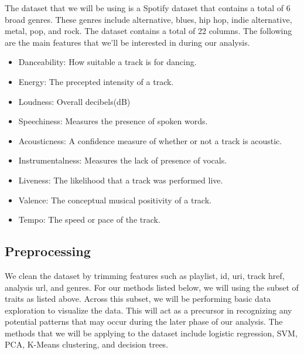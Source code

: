 \documentclass[11pt, a4paper, twocolumn]{article}
\begin{document}
The dataset that we will be using is a Spotify dataset that contains a total of 6 broad genres. These genres include alternative, blues, hip hop, indie alternative, metal, pop, and rock. The dataset contains a total of 22 columns. The following are the main features that we'll be interested in during our analysis. 
\begin{itemize}
\item Danceability: How suitable a track is for dancing. 
\item Energy: The precepted intensity of a track. 
\item Loudness: Overall decibels(dB)
\item Speechiness: Measures the presence of spoken words.
\item Acousticness: A confidence measure of whether or not a track is acoustic. 
\item Instrumentalness: Measures the lack of presence of vocals. 
\item Liveness: The likelihood that a track was performed live.
\item Valence: The conceptual musical positivity of a track. 
\item Tempo: The speed or pace of the track. 
\end{itemize}
\subsection{Preprocessing}
We clean the dataset by trimming features such as playlist, id, uri, track href, analysis url, and genres. For our methods listed below, we will using the subset of traits as listed above. Across this subset, we will be performing basic data exploration to visualize the data. This will act as a precursor in recognizing any potential patterns that may occur during the later phase of our analysis. The methods that we will be applying to the dataset include logistic regression, SVM, PCA, K-Means clustering, and decision trees. 
\end{document}
